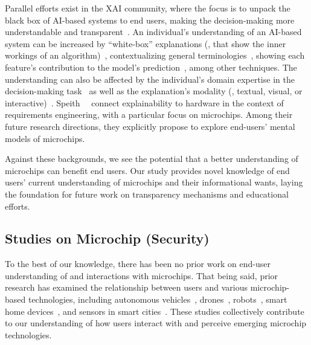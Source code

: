 Parallel efforts exist in the \acs{XAI} community, where the focus is to unpack the black box of \acs{AI}-based systems to end users, making the decision-making more understandable and transparent~\cite{DBLP:conf/fat/Speith22}. 
An individual's understanding of an \acs{AI}-based system can be increased by \enquote{white-box} explanations (\ie, that show the inner workings of an algorithm)~\cite{DBLP:conf/chi/ChengWZOGHZ19}, contextualizing general terminologies~\cite{DBLP:journals/pacmhci/ShenJCPZH20}, showing each feature's contribution to the model's prediction~\cite{DBLP:conf/iui/WangY21}, among other techniques.
The understanding can also be affected by the individual's domain expertise in the decision-making task~\cite{DBLP:conf/iui/WangY21} as well as the explanation's modality (\eg, textual, visual, or interactive)~\cite{DBLP:conf/fat/SchmudeKMT23}. 
Speith~\etal~\cite{DBLP:conf/re/SpeithSBZBP24} connect explainability to hardware in the context of requirements engineering, with a particular focus on microchips.
Among their future research directions, they explicitly propose to explore end-users' mental models of microchips.

Against these backgrounds, we see the potential that a better understanding of microchips can benefit end users. Our study provides novel knowledge of end users' current understanding of microchips and their informational wants, laying the foundation for future work on transparency mechanisms and educational efforts.


\subsection{Studies on Microchip (Security)}
To the best of our knowledge, there has been no prior work on end-user understanding of and interactions with microchips. That being said, prior research has examined the relationship between users and various microchip-based technologies, including autonomous vehicles~\cite{DBLP:conf/chi/TranPHWT24,DBLP:conf/chi/ChangCDCYCZZG24,DBLP:conf/chi/ChuZSGLGDZ23}, drones~\cite{DBLP:conf/chi/DongZCCL24}, robots~\cite{DBLP:conf/chi/SchneidersBCMCN24,DBLP:conf/chi/LuoDK24}, smart home devices~\cite{DBLP:conf/chi/ChiangKBC24}, and sensors in smart cities~\cite{DBLP:conf/chi/CorbettD24,DBLP:conf/chi/WindlW0M23}. 
These studies collectively contribute to our understanding of how users interact with and perceive emerging microchip technologies.

